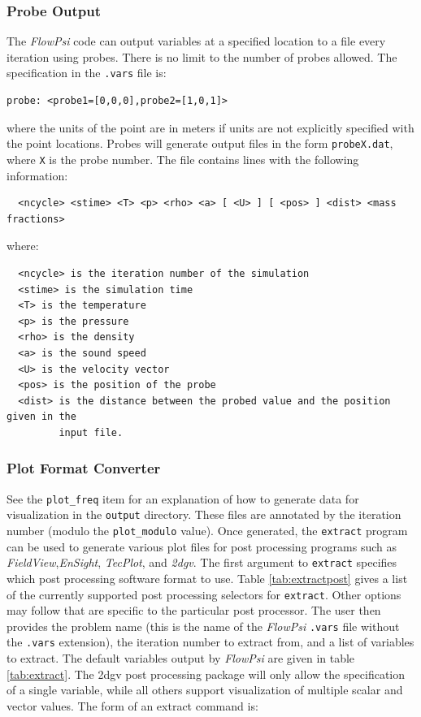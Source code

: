 \documentclass{article}
\begin{document}
\subsubsection{Probe Output}

The {\em FlowPsi} code can output variables at a specified location to a file every
iteration using probes.  There is no limit to the number of probes allowed.
The specification in the {\tt .vars} file is:
\begin{verbatim}
probe: <probe1=[0,0,0],probe2=[1,0,1]>
\end{verbatim}
where the units of the point are in meters if units are not explicitly
specified with the point locations.  Probes will generate output files
in the form {\tt probeX.dat}, where {\tt X} is the probe number.
The file contains lines with the following information:
\begin{verbatim}
  <ncycle> <stime> <T> <p> <rho> <a> [ <U> ] [ <pos> ] <dist> <mass fractions>
\end{verbatim}
where:
\begin{verbatim}
  <ncycle> is the iteration number of the simulation
  <stime> is the simulation time
  <T> is the temperature
  <p> is the pressure
  <rho> is the density
  <a> is the sound speed
  <U> is the velocity vector
  <pos> is the position of the probe
  <dist> is the distance between the probed value and the position given in the
         input file.
\end{verbatim}

\subsubsection{Plot Format Converter}
\label{sec:converter}
See the {\tt plot\_freq} item for an explanation of how to generate data
for visualization in the {\tt output} directory.  These files are annotated by the
iteration number (modulo the {\tt plot\_modulo} value).  Once generated, the
{\tt extract} program can be used to generate various plot files for post
processing programs such as {\it FieldView},{\it EnSight}, {\it
TecPlot}, and {\it 2dgv}.  The first argument to {\tt extract} specifies
which post processing software format to use.
Table \ref{tab:extractpost} gives a list of the
currently supported post processing selectors for {\tt extract}.  Other
options may follow that are specific to the particular post processor.
The user then provides the problem name (this is the name of the {\em FlowPsi}
{\tt .vars} file without the {\tt .vars} extension),
the iteration number to extract from, and
a list of variables to extract.  The default variables output by {\em FlowPsi}
are given in table \ref{tab:extract}.  The 2dgv post processing
package will only allow the specification of a single variable, while
all others support visualization of multiple scalar and vector values.
The form of an extract command is:
\end{document}
